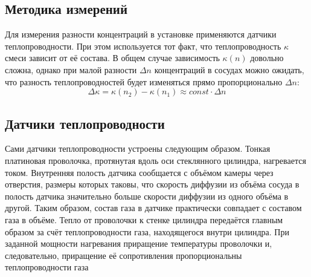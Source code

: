 \documentclass[a4paper,12pt]{article}
\theoremstyle{plain} %
\theoremstyle{definition} %
\theoremstyle{remark} %
\begin{document}
\subsection{Методика измерений}
Для измерения разности концентраций в установке применяются датчики теплопроводности. При этом используется тот факт, что теплопроводность $\kappa$ смеси зависит от её состава. В общем случае зависимость $\kappa (n)$ довольно сложна, однако при малой разности $\Delta n$ концентраций в сосудах можно ожидать, что разность теплопроводностей будет изменяться прямо пропорционально $\Delta n$:
\[\Delta \kappa = \kappa(n_2) - \kappa(n_1) \approx const \cdot \Delta n\]
\subsection{Датчики теплопроводности}
Сами датчики теплопроводности устроены следующим образом. Тонкая платиновая проволочка, протянутая вдоль оси стеклянного цилиндра, нагревается током. Внутренняя полость датчика сообщается с объёмом камеры через отверстия, размеры которых таковы, что скорость диффузии из объёма сосуда в полость датчика значительно больше скорости диффузии из одного объёма в другой. Таким образом, состав газа в датчике практически совпадает с составом газа в объёме. Тепло от проволочки к стенке цилиндра передаётся главным образом за счёт теплопроводности газа, находящегося внутри цилиндра. При заданной мощности нагревания приращение температуры проволочки и, следовательно, приращение её сопротивления пропорциональны теплопроводности газа
\end{document}

